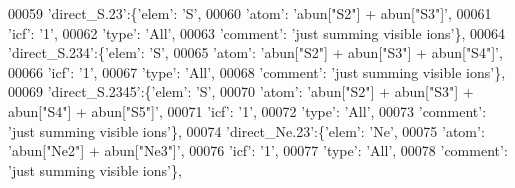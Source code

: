\begin{DoxyCode}
00059                          \textcolor{stringliteral}{'direct\_S.23'}:\{\textcolor{stringliteral}{'elem'}: \textcolor{stringliteral}{'S'},
00060                                        \textcolor{stringliteral}{'atom'}: \textcolor{stringliteral}{'abun["S2"] + abun["S3"]'},
00061                                        \textcolor{stringliteral}{'icf'}: \textcolor{stringliteral}{'1'},
00062                                        \textcolor{stringliteral}{'type'}: \textcolor{stringliteral}{'All'},
00063                                        \textcolor{stringliteral}{'comment'}: \textcolor{stringliteral}{'just summing visible ions'}\},
00064                          \textcolor{stringliteral}{'direct\_S.234'}:\{\textcolor{stringliteral}{'elem'}: \textcolor{stringliteral}{'S'},
00065                                        \textcolor{stringliteral}{'atom'}: \textcolor{stringliteral}{'abun["S2"] + abun["S3"] + abun["S4"]'},
00066                                        \textcolor{stringliteral}{'icf'}: \textcolor{stringliteral}{'1'},
00067                                        \textcolor{stringliteral}{'type'}: \textcolor{stringliteral}{'All'},
00068                                        \textcolor{stringliteral}{'comment'}: \textcolor{stringliteral}{'just summing visible ions'}\},
00069                          \textcolor{stringliteral}{'direct\_S.2345'}:\{\textcolor{stringliteral}{'elem'}: \textcolor{stringliteral}{'S'},
00070                                        \textcolor{stringliteral}{'atom'}: \textcolor{stringliteral}{'abun["S2"] + abun["S3"] + abun["S4"] + abun["S5"]'},
00071                                        \textcolor{stringliteral}{'icf'}: \textcolor{stringliteral}{'1'},
00072                                        \textcolor{stringliteral}{'type'}: \textcolor{stringliteral}{'All'},
00073                                        \textcolor{stringliteral}{'comment'}: \textcolor{stringliteral}{'just summing visible ions'}\},
00074                          \textcolor{stringliteral}{'direct\_Ne.23'}:\{\textcolor{stringliteral}{'elem'}: \textcolor{stringliteral}{'Ne'},
00075                                        \textcolor{stringliteral}{'atom'}: \textcolor{stringliteral}{'abun["Ne2"] + abun["Ne3"]'},
00076                                        \textcolor{stringliteral}{'icf'}: \textcolor{stringliteral}{'1'},
00077                                        \textcolor{stringliteral}{'type'}: \textcolor{stringliteral}{'All'},
00078                                        \textcolor{stringliteral}{'comment'}: \textcolor{stringliteral}{'just summing visible ions'}\},

\end{DoxyCode}
